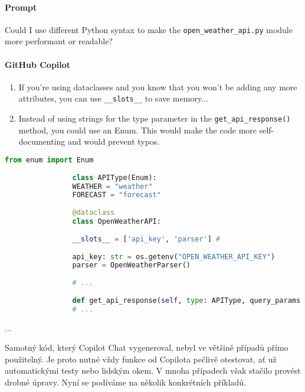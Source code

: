\documentclass[FM,DP]{tulthesis}
\begin{document}
		\vspace{0.6em}
		\begin{tcolorbox}[colback=white,colframe=black,title=Úprava výkonnosti třídy v Pythonu]
			\paragraph{Prompt}
			
			Could I use different Python syntax to make the \verb|open_weather_api.py| module more performant or readable?
			
			\vspace{0.6em}
			\paragraph{GitHub Copilot}
			\begin{enumerate}
				\item If you're using dataclasses and you know that you won't be adding any more attributes, you can use \verb|__slots__| to save memory...
				\item Instead of using strings for the type parameter in the \verb|get_api_response()| method, you could use an Enum. This would make the code more self-documenting and would prevent typos.
			\end{enumerate}
			
			\vspace{0.6em}
			
			\begin{lstlisting}[language=Python]
				from enum import Enum
				
				class APIType(Enum):
				WEATHER = "weather"
				FORECAST = "forecast"
				
				@dataclass
				class OpenWeatherAPI:
				
				__slots__ = ['api_key', 'parser'] # 
				
				api_key: str = os.getenv("OPEN_WEATHER_API_KEY")
				parser = OpenWeatherParser()
				
				# ...
				
				def get_api_response(self, type: APIType, query_params: dict[str, float | str]) -> dict:
				# ...
			\end{lstlisting}
			... \cite{dataclass}
		\end{tcolorbox}
		
		Samotný kód, který Copilot Chat vygeneroval, nebyl ve většině případů přímo použitelný. Je proto nutné vždy funkce od Copilota pečlivě otestovat, ať už automatickými testy nebo lidským okem. V mnoha případech však stačilo provést drobné úpravy. Nyní se podíváme na několik konkrétních příkladů.
		
\end{document}
